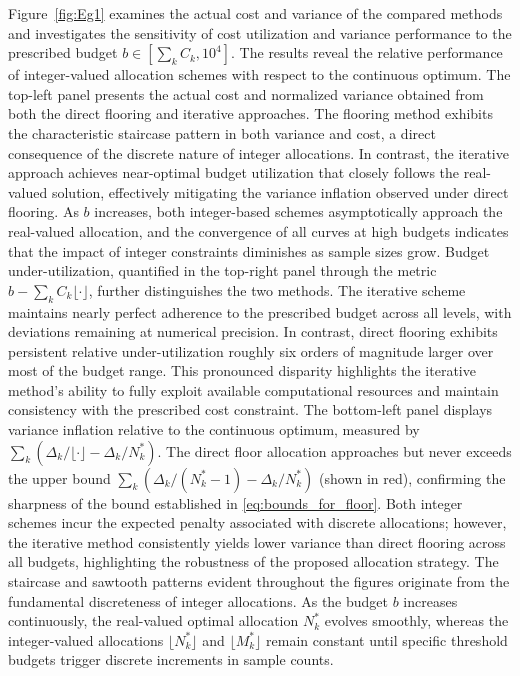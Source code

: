 Figure~\ref{fig:Eg1} examines the actual cost and variance of the compared methods and investigates the sensitivity of cost utilization and variance performance to the prescribed budget $b \in [\sum_k C_k, 10^4]$. The results reveal the relative performance of integer-valued allocation schemes with respect to the continuous optimum. The top-left panel presents the actual cost and normalized variance obtained from both the direct flooring and iterative approaches. The flooring method exhibits the characteristic staircase pattern in both variance and cost, a direct consequence of the discrete nature of integer allocations. In contrast, the iterative approach achieves near-optimal budget utilization that closely follows the real-valued solution, effectively mitigating the variance inflation observed under direct flooring. As $b$ increases, both integer-based schemes asymptotically approach the real-valued allocation, and the convergence of all curves at high budgets indicates that the impact of integer constraints diminishes as sample sizes grow. Budget under-utilization, quantified in the top-right panel through the metric $b - \sum_k C_k \lfloor \cdot \rfloor$, further distinguishes the two methods. The iterative scheme maintains nearly perfect adherence to the prescribed budget across all levels, with deviations remaining at numerical precision. In contrast, direct flooring exhibits persistent relative under-utilization roughly six orders of magnitude larger over most of the budget range. This pronounced disparity highlights the iterative method’s ability to fully exploit available computational resources and maintain consistency with the prescribed cost constraint.  The bottom-left panel displays variance inflation relative to the continuous optimum, measured by $\sum_k (\Delta_k/\lfloor \cdot \rfloor - \Delta_k/N_k^*)$. The direct floor allocation approaches but never exceeds the upper bound $\sum_k (\Delta_k/(N_k^*-1) - \Delta_k/N_k^*)$ (shown in red), confirming the sharpness of the bound established in \eqref{eq:bounds_for_floor}. Both integer schemes incur the expected penalty associated with discrete allocations; however, the iterative method consistently yields lower variance than direct flooring across all budgets, highlighting the robustness of the proposed allocation strategy.  The staircase and sawtooth patterns evident throughout the figures originate from the fundamental discreteness of integer allocations. As the budget $b$ increases continuously, the real-valued optimal allocation $N_k^*$ evolves smoothly, whereas the integer-valued allocations $\lfloor N_k^* \rfloor$ and $\lfloor M_k^* \rfloor$ remain constant until specific threshold budgets trigger discrete increments in sample counts. 







